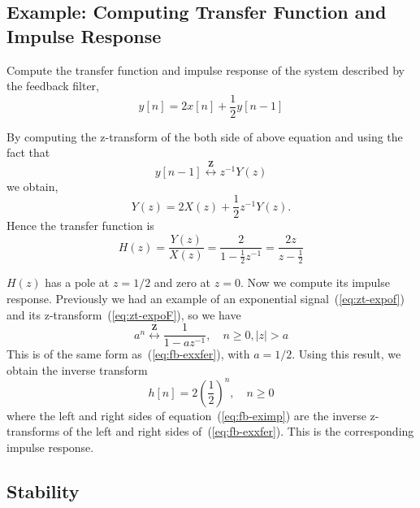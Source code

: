 \subsection{Example: Computing Transfer Function and Impulse Response}

Compute the transfer function and impulse response of the system
described by the feedback filter, 
\begin{equation}
y[n] = 2x[n] + \frac{1}{2}y[n-1]
\end{equation}

By computing the z-transform of the both side of above equation and
using the fact that
\begin{equation}
y[n-1]\stackrel{\mathbf{Z}}{\longleftrightarrow} z^{-1}Y(z)
\end{equation}
we obtain,
\begin{equation}
Y(z)= 2X(z) + \frac{1}{2}z^{-1}Y(z).
\end{equation}
Hence the transfer function is 
\begin{equation}
H(z)= \frac{Y(z)}{X(z)} = \frac{2}{1-\frac{1}{2}z^{-1}}
    = \frac{2z}{z-\frac{1}{2}} \label{eq:fb-exxfer}
\end{equation}

$H(z)$ has a pole at $z=1/2$ and zero at $z=0$. Now we
compute its impulse response. Previously we had an example of an
exponential signal~(\ref{eq:zt-expof}) and its
z-transform~(\ref{eq:zt-expoF}), so we have
\begin{equation}
a^n\stackrel{\mathbf{Z}}{\longleftrightarrow}
\frac{1}{1-az^{-1}}, \quad n \ge 0, |z|>a
\end{equation}
This is of the same form as~(\ref{eq:fb-exxfer}), with $a=1/2$.  Using
this result, we obtain the inverse transform
\begin{equation}
h[n] = 2\left(\frac{1}{2}\right)^n, \quad n\ge 0 \label{eq:fb-eximp}
\end{equation}
where the left and right sides of equation~(\ref{eq:fb-eximp}) are the
inverse z-transforms of the left and right sides
of~(\ref{eq:fb-exxfer}).  This is the corresponding impulse response.

\subsection{Stability}

